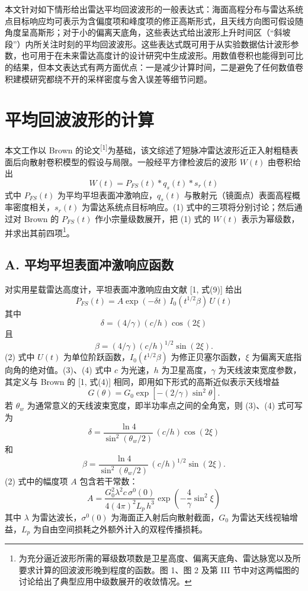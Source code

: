 本文针对如下情形给出雷达平均回波波形的一般表达式：海面高程分布与雷达系统点目标响应均可表示为含偏度项和峰度项的修正高斯形式，且天线方向图可假设随角度呈高斯形；对于小的偏离天底角，这些表达式给出波形上升时间区（“斜坡段”）内所关注时刻的平均回波波形。这些表达式既可用于从实验数据估计波形参数，也可用于在未来雷达高度计的设计研究中生成波形。用数值卷积也能得到可比的结果，但本文表达式有两方面优点：一是减少计算时间，二是避免了任何数值卷积建模研究都绕不开的采样密度与舍入误差等细节问题。

\section{平均回波波形的计算}
\seccontent
本文工作以 Brown 的论文\textsuperscript{[1]}为基础，该文综述了短脉冲雷达波形近正入射粗糙表面后向散射卷积模型的假设与局限。一般经平方律检波后的波形 $W(t)$ 由卷积给出
\[
W(t) = P_{FS}(t)*q_{s}(t)*s_{r}(t)
\tag{1}
\]
式中 $P_{FS}(t)$ 为平均平坦表面冲激响应，$q_{s}(t)$ 与散射元（镜面点）表面高程概率密度相关，$s_{r}(t)$ 为雷达系统点目标响应。(1) 式中的三项将分别讨论；然后通过对 Brown 的 $P_{FS}(t)$ 作小宗量级数展开，把 (1) 式的 $W(t)$ 表示为幂级数，并求出其前四项\footnote{为充分逼近波形所需的幂级数项数是卫星高度、偏离天底角、雷达脉宽以及所要求计算的回波波形晚到程度的函数。图 1、图 2 及第 III 节中对这两幅图的讨论给出了典型应用中级数展开的收敛情况。}。

\subsection*{A. 平均平坦表面冲激响应函数}

对实用星载雷达高度计，平坦表面冲激响应由文献 [1, 式(9)] 给出
\[
P_{FS}(t) = A\exp(-\delta t)\,I_{0}(t^{1/2}\beta)\,U(t)
\tag{2}
\]
其中
\[
\delta = (4/\gamma)(c/h)\cos(2\xi)
\tag{3}
\]
且
\[
\beta = (4/\gamma)(c/h)^{1/2}\sin(2\xi).
\tag{4}
\]
(2) 式中 $U(t)$ 为单位阶跃函数，$I_{0}(t^{1/2}\beta)$ 为修正贝塞尔函数，$\xi$ 为偏离天底指向角的绝对值。(3)、(4) 式中 $c$ 为光速，$h$ 为卫星高度，$\gamma$ 为天线波束宽度参数，其定义与 Brown 的 [1, 式(4)] 相同，即用如下形式的高斯近似表示天线增益
\[
G(\theta) = G_{0}\exp\left[-(2/\gamma)\sin^{2}\theta\right].
\tag{5}
\]
若 $\theta_{w}$ 为通常意义的天线波束宽度，即半功率点之间的全角宽，则 (3)、(4) 式可写为
\[
\delta = \frac{\ln 4}{\sin^{2}\left(\theta_{w}/2\right)}\,(c/h)\cos(2\xi)
\tag{6}
\]
和
\[
\beta = \frac{\ln 4}{\sin^{2}\left(\theta_{w}/2\right)}\,(c/h)^{1/2}\sin(2\xi).
\tag{7}
\]
(2) 式中的幅度项 $A$ 包含若干常数：
\[
A = \frac{G_{0}^{2}\lambda^{2}c\,\sigma^{0}(0)}{4(4\pi)^{2}L_{p}\,h^{3}}\exp\left(-\frac{4}{\gamma}\sin^{2}\xi\right)
\tag{8}
\]
其中 $\lambda$ 为雷达波长，$\sigma^{0}(0)$ 为海面正入射后向散射截面，$G_{0}$ 为雷达天线视轴增益，$L_{p}$ 为自由空间损耗之外额外计入的双程传播损耗。

